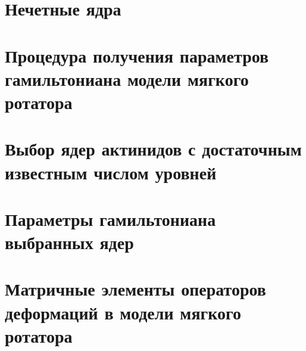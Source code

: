 \section{Нечетные ядра}

\section{Процедура получения параметров гамильтониана модели мягкого ротатора }

\section{Выбор ядер актинидов с достаточным известным числом уровней}

\section{Параметры гамильтониана выбранных ядер}

\section{Матричные элементы операторов деформаций в модели мягкого ротатора}